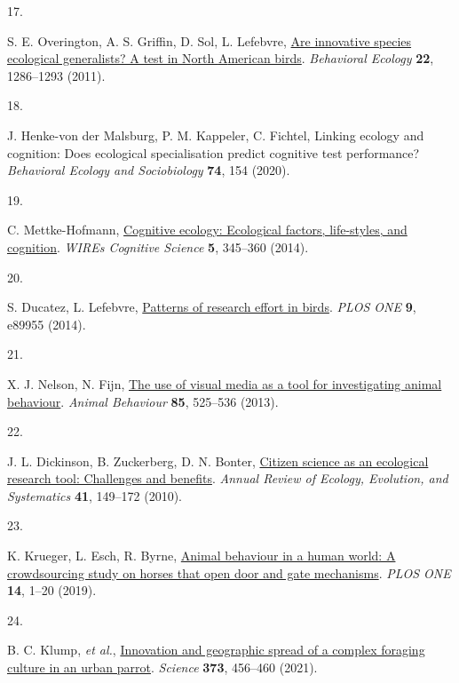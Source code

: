 \documentclass[
  man, donotrepeattitle,floatsintext]{apa6}
\newlength{\cslhangindent}
\newlength{\csllabelwidth}
\newlength{\cslentryspacingunit} %
\newenvironment{CSLReferences}[2] %
 {%
  \setlength{\parindent}{0pt}
  \ifodd #1
  \let\oldpar\par
  \def\par{\hangindent=\cslhangindent\oldpar}
  \fi
  \setlength{\parskip}{#2\cslentryspacingunit}
 }%
 {}
\newcommand{\CSLLeftMargin}[1]{\parbox[t]{\csllabelwidth}{#1}}
\newcommand{\CSLRightInline}[1]{\parbox[t]{\linewidth - \csllabelwidth}{#1}\break}
\begin{document}
\begin{CSLReferences}{0}{0}
\leavevmode{}%
\CSLLeftMargin{17. }%
\CSLRightInline{S. E. Overington, A. S. Griffin, D. Sol, L. Lefebvre, \href{https://doi.org/10.1093/beheco/arr130}{Are innovative species ecological generalists? A test in {N}orth {A}merican birds}. \emph{Behavioral Ecology} \textbf{22}, 1286--1293 (2011).}

\leavevmode{}%
\CSLLeftMargin{18. }%
\CSLRightInline{J. Henke-von der Malsburg, P. M. Kappeler, C. Fichtel, Linking ecology and cognition: Does ecological specialisation predict cognitive test performance? \emph{Behavioral Ecology and Sociobiology} \textbf{74}, 154 (2020).}

\leavevmode{}%
\CSLLeftMargin{19. }%
\CSLRightInline{C. Mettke-Hofmann, \href{https://doi.org/10.1002/wcs.1289}{Cognitive ecology: Ecological factors, life-styles, and cognition}. \emph{WIREs Cognitive Science} \textbf{5}, 345--360 (2014).}

\leavevmode{}%
\CSLLeftMargin{20. }%
\CSLRightInline{S. Ducatez, L. Lefebvre, \href{https://doi.org/10.1371/journal.pone.0089955}{Patterns of research effort in birds}. \emph{PLOS ONE} \textbf{9}, e89955 (2014).}

\leavevmode{}%
\CSLLeftMargin{21. }%
\CSLRightInline{X. J. Nelson, N. Fijn, \href{https://doi.org/10.1016/j.anbehav.2012.12.009}{The use of visual media as a tool for investigating animal behaviour}. \emph{Animal Behaviour} \textbf{85}, 525--536 (2013).}

\leavevmode{}%
\CSLLeftMargin{22. }%
\CSLRightInline{J. L. Dickinson, B. Zuckerberg, D. N. Bonter, \href{https://doi.org/10.1146/annurev-ecolsys-102209-144636}{Citizen science as an ecological research tool: Challenges and benefits}. \emph{Annual Review of Ecology, Evolution, and Systematics} \textbf{41}, 149--172 (2010).}

\leavevmode{}%
\CSLLeftMargin{23. }%
\CSLRightInline{K. Krueger, L. Esch, R. Byrne, \href{https://doi.org/10.1371/journal.pone.0218954}{Animal behaviour in a human world: A crowdsourcing study on horses that open door and gate mechanisms}. \emph{PLOS ONE} \textbf{14}, 1--20 (2019).}

\leavevmode{}%
\CSLLeftMargin{24. }%
\CSLRightInline{B. C. Klump, \emph{et al.}, \href{https://doi.org/10.1126/science.abe7808}{Innovation and geographic spread of a complex foraging culture in an urban parrot}. \emph{Science} \textbf{373}, 456--460 (2021).}


\end{CSLReferences}
\end{document}

